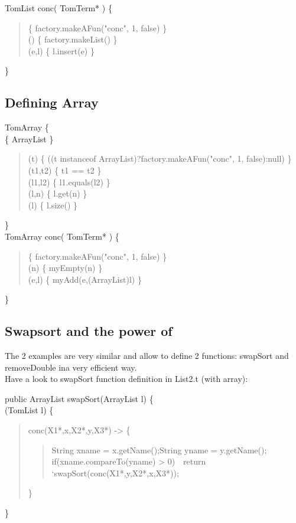 \oplist TomList conc( TomTerm* ) \{\\
\begin{quote}
 \fsym \{ factory.makeAFun("conc", 1, false) \}\\
 \emptyl()  \{ factory.makeList() \}\\
 \minsert(e,l) \{ l.insert(e) \}\\
\end{quote}
\}\\

\subsection{Defining Array}

\typearray TomArray \{\\
 \implement \{ ArrayList \}\\
\begin{quote}
 \getfs(t)   \{ ((t instanceof ArrayList)?factory.makeAFun("conc", 1, false):null) \}\\
 \cmpfs(t1,t2) \{ t1 == t2 \}\\
 \equals(l1,l2)      \{ l1.equals(l2) \}\\
 \getel(l,n)   \{ l.get(n) \}\\
 \getsize(l)        \{ l.size() \}\\
\end{quote}
\}\\
\oparray TomArray conc( TomTerm* ) \{\\
\begin{quote}
 \fsym            \{ factory.makeAFun("conc", 1, false) \}\\
 \emptya(n)   \{ myEmpty(n) \}\\
 \mappend(e,l) \{ myAdd(e,(ArrayList)l) \}\\
\end{quote}
\}\\

\subsection{Swapsort and the power of \TOM}
The 2 examples are very similar and allow to define 2 functions:
swapSort and removeDouble ina very efficient way.
\\Have a look to swapSort function definition in List2.t (with array):

public ArrayList swapSort(ArrayList l) \{\\
  \match(TomList l) \{\\
\begin{quote}
   \textsf{conc(X1*,x,X2*,y,X3*)} -> \{\\
   \begin{quote}
   String xname = x.getName();String yname = y.getName();\\
   \textsf{if(xname.compareTo(yname) > 0)\ \  return `swapSort(conc(X1*,y,X2*,x,X3*));}\\
   \end{quote}      
\}\\
\end{quote}      
\}\\

